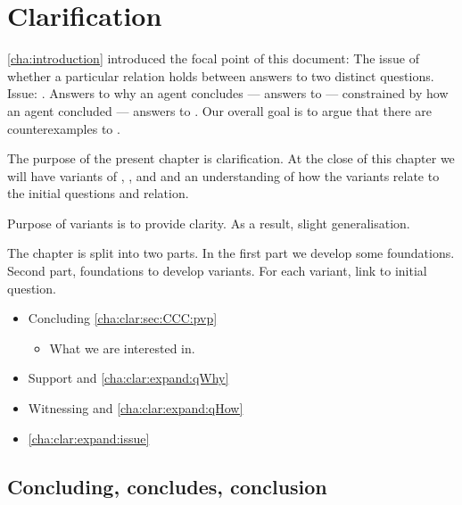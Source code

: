 \chapter{Clarification}
\label{cha:clarification}

\begin{note}
  \autoref{cha:introduction} introduced the focal point of this document:
  The issue of whether a particular relation holds between answers to two distinct questions.
  Issue: \issueInclusion{}.
  Answers to why an agent concludes  --- answers to \qWhy{} --- constrained by how an agent concluded --- answers to \qHow{}.
  Our overall goal is to argue that there are counterexamples to \issueInclusion{}.

  The purpose of the present chapter is clarification.
  At the close of this chapter we will have variants of \qWhy{}, \qHow{}, and \issueInclusion{} and an understanding of how the variants relate to the initial questions and relation.

  Purpose of variants is to provide clarity.
  As a result, slight generalisation.
\end{note}

\begin{note}
  The chapter is split into two parts.
  In the first part we develop some foundations.
  Second part, foundations to develop variants.
  For each variant, link to initial question.

  \begin{itemize}
  \item
    Concluding \hfill \autoref{cha:clar:sec:CCC:pvp}
    \begin{itemize}
    \item
      What we are interested in.
    \end{itemize}
  \end{itemize}

  \begin{itemize}
  \item
    Support and \qWhy{} \hfill \autoref{cha:clar:expand:qWhy}
  \item
    Witnessing and \qHow{} \hfill \autoref{cha:clar:expand:qHow}
  \item
    \issueInclusion{} \hfill \autoref{cha:clar:expand:issue}
  \end{itemize}
\end{note}

\section{Concluding, concludes, conclusion}
\label{cha:clar:sec:CCC}


